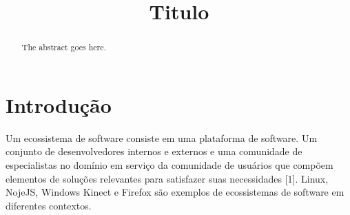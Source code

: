 \documentclass[conference]{IEEEtran}
\begin{document}
\title{Titulo}

\author{
\and
{}
\and
{}
}

\maketitle


\begin{abstract}
The abstract goes here.
\end{abstract}

\IEEEpeerreviewmaketitle



\section{Introdução}

Um ecossistema de software consiste em uma plataforma de software. Um conjunto de desenvolvedores internos e externos e uma comunidade de especialistas no domínio em serviço da comunidade de usuários que compõem elementos de soluções relevantes para satisfazer suas necessidades [1]. Linux, NojeJS, Windows Kinect e Firefox são exemplos de ecossistemas de software em diferentes contextos. 
\end{document}
